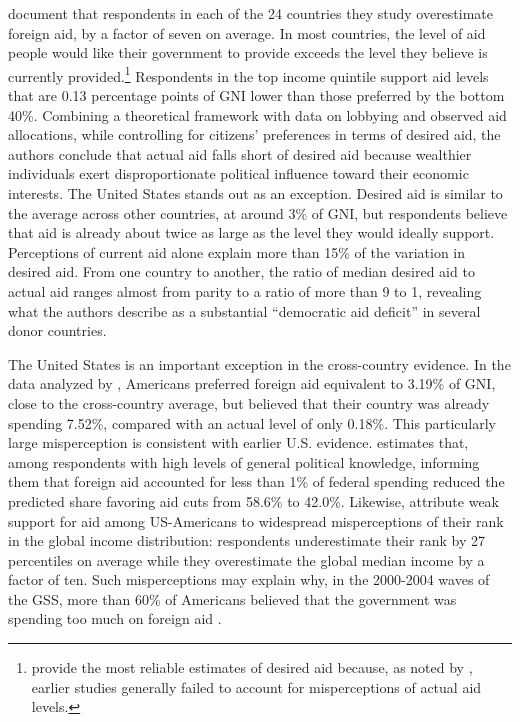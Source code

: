 \citet{kaufmann_foreign_2019} document that respondents in each of the 24 countries they study overestimate foreign aid, by a factor of seven on average. In most countries, the level of aid people would like their government to provide exceeds the level they believe is currently provided.\footnote{\citet{kaufmann_foreign_2012} provide the most reliable estimates of desired aid because, as noted by \citet{hudson_mile_2012}, earlier studies generally failed to account for misperceptions of actual aid levels.} Respondents in the top income quintile support aid levels that are 0.13 percentage points of GNI lower than those preferred by the bottom 40\%. Combining a theoretical framework with data on lobbying and observed aid allocations, while controlling for citizens' preferences in terms of desired aid, the authors conclude that actual aid falls short of desired aid because wealthier individuals exert disproportionate political influence toward their economic interests. The United States stands out as an exception. Desired aid is similar to the average across other countries, at around 3\% of GNI, but respondents believe that aid is already about twice as large as the level they would ideally support. Perceptions of current aid alone explain more than 15\% of the variation in desired aid. From one country to another, the ratio of median desired aid to actual aid ranges almost from parity to a ratio of more than 9 to 1, revealing what the authors describe as a substantial ``democratic aid deficit'' in several donor countries.

The United States is an important exception in the cross-country evidence. In the data analyzed by \citet{kaufmann_foreign_2019}, Americans preferred foreign aid equivalent to 3.19\% of GNI, close to the cross-country average, but believed that their country was already spending 7.52\%, compared with an actual level of only 0.18\%. This particularly large misperception is consistent with earlier U.S. evidence. \citet{gilens_political_2001} estimates that, among respondents with high levels of general political knowledge, informing them that foreign aid accounted for less than 1\% of federal spending reduced the predicted share favoring aid cuts from 58.6\% to 42.0\%. Likewise, \citet{nair_misperceptions_2018} attribute weak support for aid among US-Americans to widespread misperceptions of their rank in the global income distribution: respondents underestimate their rank by 27 percentiles on average while they overestimate the global median income by a factor of ten. Such misperceptions may explain why, in the 2000-2004 waves of the GSS, more than 60\% of Americans believed that the government was spending too much on foreign aid \citep{okten_preferences_2007}.

